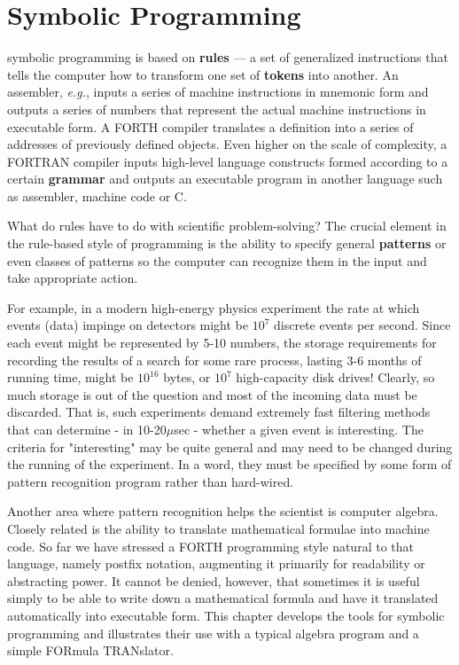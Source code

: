 
\chapter{Symbolic Programming}
 symbolic programming is based on \textbf{rules} --- a set of generalized instructions that tells the computer how to transform one set of \textbf{tokens} into another. An assembler, \textit{e.g.}, inputs a series of machine instructions in mnemonic form and outputs a series of numbers that represent the actual machine instructions in executable form. A FORTH compiler translates a definition into a series of addresses of previously defined objects. Even higher on the scale of complexity, a FORTRAN compiler inputs high-level language constructs formed according to a certain \textbf{grammar} and outputs an executable program in another language such as assembler, machine code or C.

What do rules have to do with scientific problem-solving? The crucial element in the rule-based style of programming is the ability to specify general \textbf{patterns} or even classes of patterns so the computer can recognize them in the input and take appropriate action.

For example, in a modern high-energy physics experiment the rate at which events (data) impinge on detectors might be $10^{7}$ discrete events per second. Since each event might be represented by 5-10 numbers, the storage requirements for recording the results of a search for some rare process, lasting 3-6 months of running time, might be $10^16$ bytes, or $10^7$ high-capacity disk drives! Clearly, so much storage is out of the question and most of the incoming data must be discarded. That is, such experiments demand extremely fast filtering methods that can determine - in 10-20$\mu$sec - whether a given event is interesting. The criteria for "interesting" may be quite general and may need to be changed during the running of the experiment. In a word, they must be specified by some form of pattern recognition program rather than hard-wired.

Another area where pattern recognition helps the scientist is computer algebra. Closely related is the ability to translate mathematical formulae into machine code. So far we have stressed a FORTH programming style natural to that language, namely postfix notation, augmenting it primarily for readability or abstracting power. It cannot be denied, however, that sometimes it is useful simply to be able to write down a mathematical formula and have it translated automatically into executable form. This chapter develops the tools for symbolic programming and illustrates their use with a typical algebra program and a simple FORmula TRANslator.

